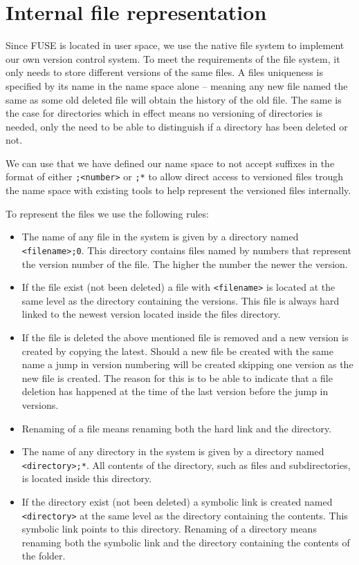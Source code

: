 \documentclass[12pt]{article}
\begin{document}
\section{Internal file representation}
Since FUSE is located in user space, we use the native file system to
implement our own version control system. To meet the requirements of
the file system, it only needs to store different versions of the same
files. A files uniqueness is specified by its name in the name space
alone – meaning any new file named the same as some old deleted file
will obtain the history of the old file. The same is the case for
directories which in effect means no versioning of directories is
needed, only the need to be able to distinguish if a directory has
been deleted or not.

We can use that we have defined our name space to not accept suffixes
in the format of either \texttt{;<number>} or \texttt{;*} to allow direct access to
versioned files trough the name space with existing tools to help
represent the versioned files internally.

To represent the files we use the following rules:

\begin{itemize}
\item The name of any file in the system is given by a directory named
  \texttt{<filename>;0}. This directory contains files named by numbers that
  represent the version number of the file. The higher the number the
  newer the version.
\item If the file exist (not been deleted) a file with \texttt{<filename>} is
  located at the same level as the directory containing the
  versions. This file is always hard linked to the newest version
  located inside the files directory.
\item If the file is deleted the above mentioned file is removed and a
  new version is created by copying the latest. Should a new file be
  created with the same name a jump in version numbering will be
  created skipping one version as the new file is created. The reason
  for this is to be able to indicate that a file deletion has happened
  at the time of the last version before the jump in versions.
\item Renaming of a file means renaming both the hard link and the
  directory.
\item The name of any directory in the system is given by a directory
  named \texttt{<directory>;*}. All contents of the directory, such as files
  and subdirectories, is located inside this directory.
\item If the directory exist (not been deleted) a symbolic link is
  created named \texttt{<directory>} at the same level as the directory
  containing the contents. This symbolic link points to this
  directory.  Renaming of a directory means renaming both the symbolic
  link and the directory containing the contents of the folder.
\end{itemize}
\end{document}
